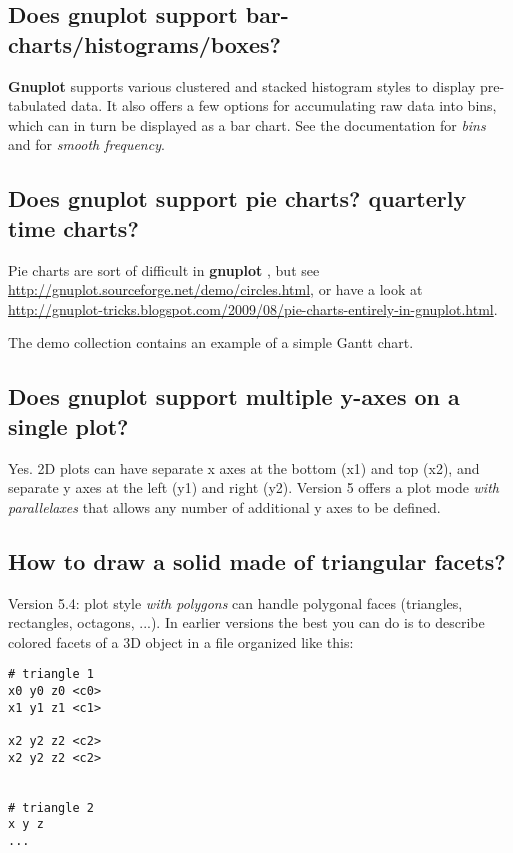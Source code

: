 \documentclass[letter,11pt]{article}
\def\http#1{{\small\href{http://#1}{\url{http://#1}}}}
\newcommand{\http}[1]%
            {\htmladdnormallink{\latex{\url{http://#1}}%
                    \html{\textit{http://#1}}}%
                {http://#1}%
            }
\newcommand{\gnuplot}{\textbf{gnuplot }}
\newcommand{\Gnuplot}{\textbf{Gnuplot }}
\begin{document}
{\subsection{Does \gnuplot support bar-charts/histograms/boxes?}

\Gnuplot{} supports various clustered and stacked histogram styles to display
pre-tabulated data.  It also offers a few options for accumulating raw data
into bins, which can in turn be displayed as a bar chart.  See the documentation
for \textit{bins} and for \textit{smooth frequency}.

\subsection{Does \gnuplot support pie charts? quarterly time charts?}

Pie charts are sort of difficult in \gnuplot, but see
\http{gnuplot.sourceforge.net/demo/circles.html},
or have a look at
\http{gnuplot-tricks.blogspot.com/2009/08/pie-charts-entirely-in-gnuplot.html}.

The demo collection contains an example of a simple Gantt chart.

\subsection{Does \gnuplot support multiple y-axes on a single plot?}

Yes. 2D plots can have separate x axes at the bottom (x1) and top (x2),
and separate y axes at the left (y1) and right (y2).  Version 5 offers a
plot mode \textit{with parallelaxes} that allows any number of additional
y axes to be defined.

\subsection{How to draw a solid made of triangular facets?}

Version 5.4: plot style \textit{with polygons} can handle polygonal faces
(triangles, rectangles, octagons, ...).
In earlier versions the best you can do is to describe colored facets of a
3D object in a file organized like this:
\small
\begin{verbatim}
# triangle 1
x0 y0 z0 <c0>
x1 y1 z1 <c1>

x2 y2 z2 <c2>
x2 y2 z2 <c2>


# triangle 2
x y z
...
\end{verbatim}
\normalsize

}
\end{document}

